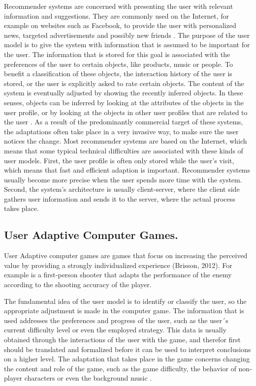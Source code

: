 Recommender systems are concerned with presenting the user with relevant
information and suggestions. They are commonly used on the Internet, for example
on websites such as Facebook, to provide the user with personalized news,
targeted advertisements and possibly new friends \cite{brun2010compass}. The
purpose of the user model is to give the system with information that is assumed
to be important for the user. The information that is stored for this goal is
associated with the preferences of the user to certain objects, like products,
music or people. To benefit a classification of these objects, the interaction
history of the user is stored, or the user is explicitly asked to rate certain
objects. The content of the system is eventually adjusted by showing the
recently inferred objects. In these senses, objects can be inferred by looking
at the attributes of the objects in the user profile, or by looking at the
objects in other user profiles that are related to the user \cite{kobsa2001generic} 
\cite{kay2012coming}.  As a result of the predominantly commercial target of these
systems, the adaptations often take place in a very invasive way, to make sure
the user notices the change. Most recommender systems are based on the Internet,
which means that some typical technical difficulties  are associated with these
kinds of user models. First, the user profile is often only stored while the
user’s visit,  which means that fast and efficient adaption is important.
Recommender systems usually become more precise  when the user spends more time
with the system. Second, the system’s architecture is usually client-server,
where the client side gathers user information and sends it to the server, where
the  actual process takes place.

\subsection{User Adaptive Computer Games.}  

User Adaptive computer games are games that focus on increasing the perceived
value by providing a strongly individualized experience (Brisson, 2012).  For
example is a first‐person shooter that adapts the performance of the enemy
according to the shooting accuracy of the player.

The fundamental idea of the user model is to identify or classify the user, so
the appropriate adjustment is made in the computer game. The information that is
used addresses the preferences and progress of the user, such as the user´s
current  difficulty level or even the employed strategy. This data is usually
obtained through the interactions of  the user with the game, and therefor first
should be translated and formalized  before it can be  used to interpret
conclusions on a higher level. The adaptation that takes place in the game
concerns changing the content and role of the  game, such as the game
difficulty, the behavior of non‐player characters  or even the background  music
\cite{bakkes2012personalised}.

